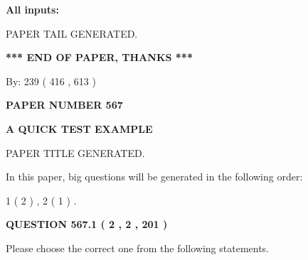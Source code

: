 \documentclass[12pt]{article}
\begin{document}
   
   
   
\noindent{}
   
   
   
   
\noindent\vspace{0.1in}\hspace{-0.08in} {\textbf{\Large{All inputs: }}}
   
   
   
   
   
   
 \vspace{0.2in}
 
   
   
\vspace{2.0in} PAPER TAIL GENERATED.
   
   
   
   
\vspace{1.0in} 
{\textbf{\large{ *** END OF PAPER, THANKS *** }}} 
   
   
\hspace{1.0in} By: 
 239 ( 416 ,  613 )
   
   
   
   
\newpage 
\setcounter{page}{ 
   567001 } 
   
   
   
   
 {\textbf{ \Large{ PAPER NUMBER  567  }}}
   
   
\vspace{0.2in}
   
   
   
   
   
   
   
   
 \vspace{0.2in}
{\LARGE {\textbf{ A QUICK TEST EXAMPLE}}}
   
   
 PAPER TITLE GENERATED.
   
   
   
\vspace{0.2in}
   
In this paper, big questions will be generated in the following order: 
   
   
   1 ( 2 )
 ,
   2 ( 1 )
 .
  
\vspace{0.2in}
  
{\textbf{\Large{QUESTION
567.1 
 ( 2 , 2 , 201 )
}}}
  
  
Please choose the correct one from the following statements.
 
\end{document}
